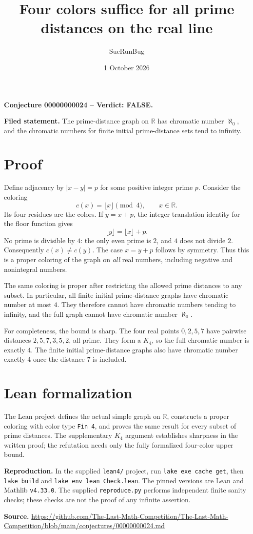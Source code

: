 \documentclass[11pt]{article}
\title{Four colors suffice for all prime distances on the real line}
\author{SucRunBug}
\date{1 October 2026}
\begin{document}
\maketitle
\textbf{Conjecture 00000000024 -- Verdict: FALSE.}

\textbf{Filed statement.} The prime-distance graph on $\mathbb R$ has chromatic number $\aleph_0$, and the chromatic numbers for finite initial prime-distance sets tend to infinity.

\section*{Proof}
Define adjacency by $|x-y|=p$ for some positive integer prime $p$. Consider the coloring
\[c(x)=\lfloor x\rfloor\pmod 4,\qquad x\in\mathbb R.\]
Its four residues are the colors. If $y=x+p$, the integer-translation identity for the floor function gives
\[\lfloor y\rfloor=\lfloor x\rfloor+p.\]
No prime is divisible by $4$: the only even prime is $2$, and $4$ does not divide $2$. Consequently $c(x)\ne c(y)$. The case $x=y+p$ follows by symmetry. Thus this is a proper coloring of the graph on \emph{all} real numbers, including negative and nonintegral numbers.

The same coloring is proper after restricting the allowed prime distances to any subset. In particular, all finite initial prime-distance graphs have chromatic number at most $4$. They therefore cannot have chromatic numbers tending to infinity, and the full graph cannot have chromatic number $\aleph_0$.

For completeness, the bound is sharp. The four real points $0,2,5,7$ have pairwise distances $2,5,7,3,5,2$, all prime. They form a $K_4$, so the full chromatic number is exactly $4$. The finite initial prime-distance graphs also have chromatic number exactly $4$ once the distance $7$ is included.

\section*{Lean formalization}
The Lean project defines the actual simple graph on $\mathbb R$, constructs a proper coloring with color type \texttt{Fin 4}, and proves the same result for every subset of prime distances. The supplementary $K_4$ argument establishes sharpness in the written proof; the refutation needs only the fully formalized four-color upper bound.

\textbf{Reproduction.} In the supplied \texttt{lean4/} project, run
\texttt{lake exe cache get}, then \texttt{lake build} and
\texttt{lake env lean Check.lean}. The pinned versions are Lean and Mathlib
\texttt{v4.33.0}. The supplied \texttt{reproduce.py} performs independent
finite sanity checks; these checks are not the proof of any infinite assertion.

\textbf{Source.} \url{https://github.com/The-Last-Math-Competition/The-Last-Math-Competition/blob/main/conjectures/00000000024.md}
\end{document}
